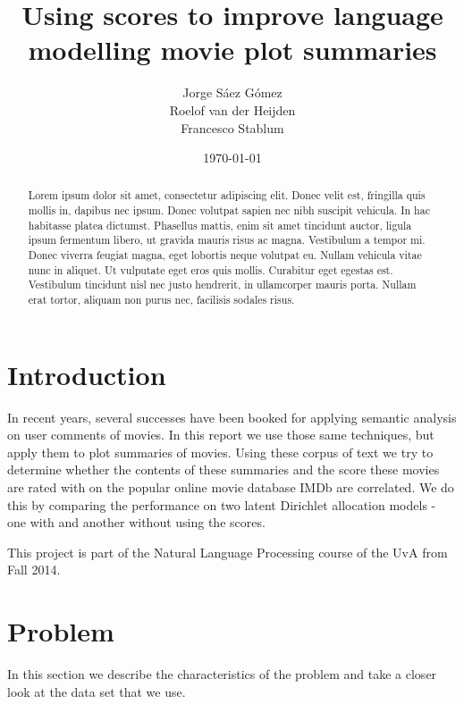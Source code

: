 \documentclass[a4paper,10pt]{article}
\title{Using scores to improve language modelling movie plot summaries}
\author{Jorge S\'{a}ez G\'{o}mez\\
Roelof van der Heijden\\
Francesco Stablum
}
\date{\today}
\begin{document}
\maketitle
\begin{abstract}
  Lorem ipsum dolor sit amet, consectetur adipiscing elit. Donec velit est, fringilla quis mollis in, dapibus nec ipsum. Donec volutpat sapien nec nibh suscipit vehicula. In hac habitasse platea dictumst. Phasellus mattis, enim sit amet tincidunt auctor, ligula ipsum fermentum libero, ut gravida mauris risus ac magna. Vestibulum a tempor mi. Donec viverra feugiat magna, eget lobortis neque volutpat eu. Nullam vehicula vitae nunc in aliquet. Ut vulputate eget eros quis mollis. Curabitur eget egestas est. Vestibulum tincidunt nisl nec justo hendrerit, in ullamcorper mauris porta. Nullam erat tortor, aliquam non purus nec, facilisis sodales risus.
\end{abstract}

\section{Introduction} 
In recent years, several successes have been booked for applying semantic analysis on user comments of movies.
In this report we use those same techniques, but apply them to plot summaries of movies.
Using these corpus of text we try to determine whether the contents of these summaries and the score these movies are rated with on the popular online movie database IMDb \cite{imdb} are correlated.
We do this by comparing the performance on two latent Dirichlet allocation models - one with and another without using the scores.

This project is part of the Natural Language Processing course of the UvA from Fall 2014.

\section{Problem}
In this section we describe the characteristics of the problem and take a closer look at the data set that we use.

\end{document}
